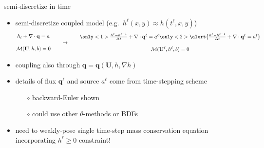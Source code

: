 \documentclass[xcolor={dvipsnames}]{beamer}
\newcommand\bq{\mathbf{q}}
\newcommand\bU{\mathbf{U}}
\newcommand\Div{\nabla\cdot}
\newcommand\grad{\nabla}
\begin{document}
\newcommand{\singletsmc}{\frac{h^\ell - h^{\ell-1}}{\Delta t} + \Div \bq^\ell = a^\ell}
\begin{frame}{semi-discretize in time}

\begin{itemize}
\item semi-discretize coupled model (e.g.~$h^\ell(x,y) \approx h(t^\ell,x,y)$)
$$\begin{matrix}
 h_t + \Div\bq = a \\
 \phantom{foo} \\
 \mathcal{M}(\bU,h,b) = 0
\end{matrix} \qquad \to \qquad \begin{matrix}
 \only<1>{\singletsmc} \only<2>{\alert{\singletsmc}} \\
 \phantom{foo} \\
 \mathcal{M}(\bU^\ell,h^\ell,b) = 0
\end{matrix}$$
\item coupling also through $\bq=\bq(\bU,h,\grad h)$
\item details of flux $\bq^\ell$ and source $a^\ell$ come from time-stepping scheme
        \begin{itemize}
        \item[$\circ$] backward-Euler shown
        \item[$\circ$] could use other $\theta$-methods or BDFs
        \end{itemize}
\item<2> \alert{need to weakly-pose single time-step mass conservation equation incorporating $h^\ell\ge 0$ constraint!}
\end{itemize}
\end{frame}
\end{document}
